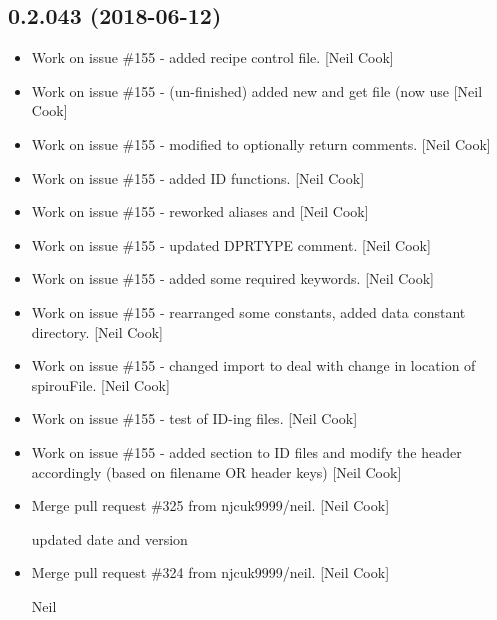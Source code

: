 \documentclass[a4paper,10pt,english]{report}
\begin{document}
\subsection{0.2.043 (2018-06-12)}
\label{\detokenize{misc/changelog:id423}}\begin{itemize}
\item {} 
Work on issue \#155 - added recipe control file. {[}Neil Cook{]}

\item {} 
Work on issue \#155 - (un-finished) added new  and
get file (now use  {[}Neil Cook{]}

\item {} 
Work on issue \#155 - modified  to optionally return
comments. {[}Neil Cook{]}

\item {} 
Work on issue \#155 - added ID functions. {[}Neil Cook{]}

\item {} 
Work on issue \#155 - reworked aliases and  {[}Neil Cook{]}

\item {} 
Work on issue \#155 - updated DPRTYPE comment. {[}Neil Cook{]}

\item {} 
Work on issue \#155 - added some required keywords. {[}Neil Cook{]}

\item {} 
Work on issue \#155 - rearranged some constants, added data constant
directory. {[}Neil Cook{]}

\item {} 
Work on issue \#155 - changed import to deal with change in location of
spirouFile. {[}Neil Cook{]}

\item {} 
Work on issue \#155 - test of ID-ing files. {[}Neil Cook{]}

\item {} 
Work on issue \#155 - added section to ID files and modify the header
accordingly (based on filename OR header keys) {[}Neil Cook{]}

\item {} 
Merge pull request \#325 from njcuk9999/neil. {[}Neil Cook{]}

updated date and version

\item {} 
Merge pull request \#324 from njcuk9999/neil. {[}Neil Cook{]}

Neil

\end{itemize}
\end{document}

